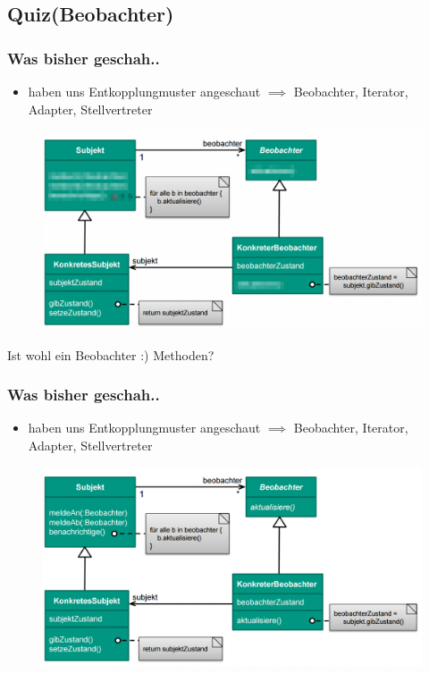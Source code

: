 \documentclass[18pt]{beamer}
\begin{document}
	\subsection{Quiz(Beobachter)}
	
	\begin{frame}
		\frametitle{Was bisher geschah..}
		\begin{itemize}
			\item haben uns Entkopplungmuster angeschaut
			\linebreak $\implies$ Beobachter, Iterator, Adapter, Stellvertreter
		\end{itemize}
		\begin{figure}
			\includegraphics[scale=0.25]{./pics/tut4/obs-mod.png}
		\end{figure}
		\pause Ist wohl ein Beobachter :) \pause Methoden?
	\end{frame}
	
	\begin{frame}
		\frametitle{Was bisher geschah..}
		\begin{itemize}
			\item haben uns Entkopplungmuster angeschaut
			\linebreak $\implies$ Beobachter, Iterator, Adapter, Stellvertreter
		\end{itemize}
		\begin{figure}
			\includegraphics[scale=0.35]{./pics/tut3/obs.png}
		\end{figure}
	\end{frame}
\end{document}
